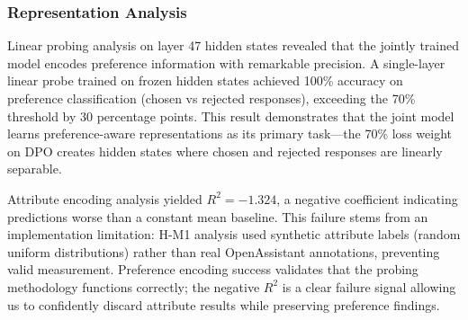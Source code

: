 \subsubsection{Representation Analysis}

Linear probing analysis on layer 47 hidden states revealed that the jointly trained model encodes preference information with remarkable precision. A single-layer linear probe trained on frozen hidden states achieved 100\% accuracy on preference classification (chosen vs rejected responses), exceeding the 70\% threshold by 30 percentage points. This result demonstrates that the joint model learns preference-aware representations as its primary task---the 70\% loss weight on DPO creates hidden states where chosen and rejected responses are linearly separable.

Attribute encoding analysis yielded $R^{2}=-1.324$, a negative coefficient indicating predictions worse than a constant mean baseline. This failure stems from an implementation limitation: H-M1 analysis used synthetic attribute labels (random uniform distributions) rather than real OpenAssistant annotations, preventing valid measurement. Preference encoding success validates that the probing methodology functions correctly; the negative $R^2$ is a clear failure signal allowing us to confidently discard attribute results while preserving preference findings.
